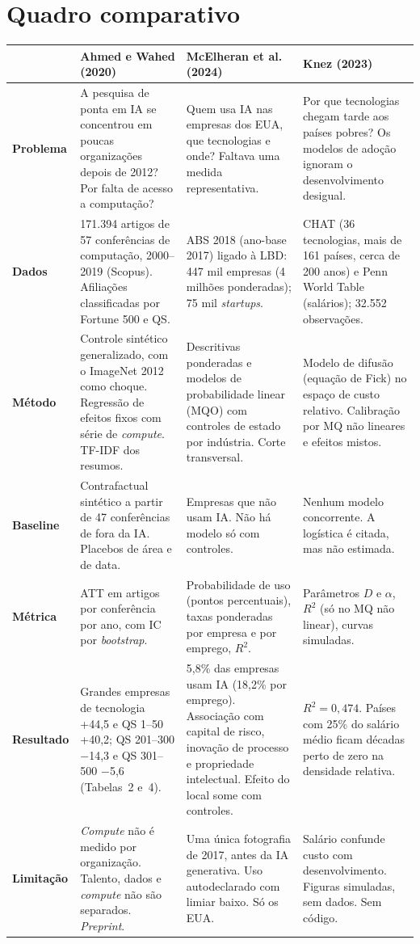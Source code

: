\section{Quadro comparativo}

{\footnotesize
\begin{longtable}{@{}L{2.1cm}L{4.2cm}L{4.2cm}L{4.2cm}@{}}
\toprule
& \textbf{Ahmed e Wahed (2020)} & \textbf{McElheran et al. (2024)} & \textbf{Knez (2023)} \\
\midrule
\endhead
\bottomrule
\endlastfoot
\textbf{Problema} &
A pesquisa de ponta em IA se concentrou em poucas organizações depois de 2012? Por falta de
acesso a computação? &
Quem usa IA nas empresas dos EUA, que tecnologias e onde? Faltava uma medida representativa. &
Por que tecnologias chegam tarde aos países pobres? Os modelos de adoção ignoram o
desenvolvimento desigual. \\ \addlinespace
\textbf{Dados} &
171.394 artigos de 57 conferências de computação, 2000--2019 (Scopus). Afiliações classificadas
por Fortune 500 e QS. &
ABS 2018 (ano-base 2017) ligado à LBD: 447 mil empresas (4 milhões ponderadas); 75 mil
\emph{startups}. &
CHAT (36 tecnologias, mais de 161 países, cerca de 200 anos) e Penn World Table (salários);
32.552 observações. \\ \addlinespace
\textbf{Método} &
Controle sintético generalizado, com o ImageNet 2012 como choque. Regressão de efeitos fixos com
série de \emph{compute}. TF-IDF dos resumos. &
Descritivas ponderadas e modelos de probabilidade linear (MQO) com controles de estado por
indústria. Corte transversal. &
Modelo de difusão (equação de Fick) no espaço de custo relativo. Calibração por MQ não lineares e
efeitos mistos. \\ \addlinespace
\textbf{Baseline} &
Contrafactual sintético a partir de 47 conferências de fora da IA. Placebos de área e de data. &
Empresas que não usam IA. Não há modelo só com controles. &
Nenhum modelo concorrente. A logística é citada, mas não estimada. \\ \addlinespace
\textbf{Métrica} &
ATT em artigos por conferência por ano, com IC por \emph{bootstrap}. &
Probabilidade de uso (pontos percentuais), taxas ponderadas por empresa e por emprego, $R^2$. &
Parâmetros $D$ e $\alpha$, $R^2$ (só no MQ não linear), curvas simuladas. \\ \addlinespace
\textbf{Resultado} &
Grandes empresas de tecnologia +44,5 e QS 1--50 +40,2; QS 201--300 $-$14,3 e QS 301--500 $-$5,6
(Tabelas~2 e~4). &
5,8\% das empresas usam IA (18,2\% por emprego). Associação com capital de risco, inovação de
processo e propriedade intelectual. Efeito do local some com controles. &
$R^2 = 0{,}474$. Países com 25\% do salário médio ficam décadas perto de zero na densidade
relativa. \\ \addlinespace
\textbf{Limitação} &
\emph{Compute} não é medido por organização. Talento, dados e \emph{compute} não são separados.
\emph{Preprint}. &
Uma única fotografia de 2017, antes da IA generativa. Uso autodeclarado com limiar baixo. Só os
EUA. &
Salário confunde custo com desenvolvimento. Figuras simuladas, sem dados. Sem código. \\
\end{longtable}
}

